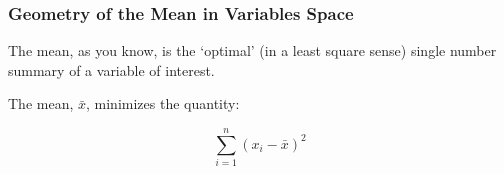 \documentclass{beamer}
\begin{document}
\begin{frame}
  \frametitle{Geometry of the Mean in Variables Space}

The mean, as you know, is the `optimal' (in a least square sense) single number summary of a variable of interest.


\medskip

\begin{center}
\end{center}



The mean, $\bar{x}$, minimizes the quantity:

\begin{equation*}
 \sum_{i=1}^{n}(x_i-\bar{x})^2
\end{equation*}

\end{frame}
\end{document}
